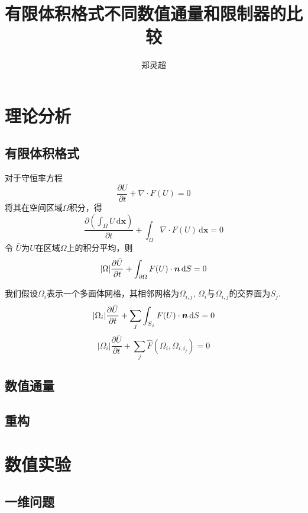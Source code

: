\documentclass[a4paper,  11pt]{ctexart}
\newcommand\bx{\boldsymbol{x}}
\newcommand\dd{\,\mathrm{d}}
\newcommand\pd[2]{\dfrac{\partial {#1}}{\partial {#2}}}
\newcommand{\bm}[1]{\mbox{\boldmath{$#1$}}}
\begin{document}
\title{有限体积格式不同数值通量和限制器的比较}
\author{郑灵超}  
\maketitle

\section{理论分析}
\subsection{有限体积格式} 
对于守恒率方程 
\begin{equation}
  \label{eq:ConservationLaws}
  \pd{U}{t}+\nabla \cdot F(U) = 0
\end{equation}  
将其在空间区域$\Omega$积分，得
\[  
\pd{(\int_{\Omega}U\dd\bx)}{t} + \int_{\Omega} \nabla \cdot F(U)\dd\bx = 0
\]
令 $\bar{U}$为$U$在区域$\Omega$上的积分平均，则
\[  
    |\Omega|\pd{\bar{U}}{t} + \int_{\partial\Omega} F(U)\cdot \bm{n}
    \dd S = 0
\]

我们假设$\Omega_i$表示一个多面体网格，其相邻网格为$\Omega_{i,j}$,
$\Omega_i$与$\Omega_{i,j}$的交界面为$S_j$.
\[  
   |\Omega_i|\pd{\bar{U}}{t} + \sum_{j} \int_{S_j} F(U)\cdot \bm{n}
   \dd S = 0
\]
\[   
|\Omega_i|\pd{\bar{U}}{t} + \sum_{j} \hat{F}(\Omega_i,\Omega_{i,i_j})= 0 
\] 
\subsection{数值通量}
\subsection{重构}


\section{数值实验}
\subsection{一维问题}
\end{document}
